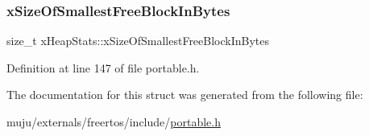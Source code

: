 \subsubsection{\texorpdfstring{x\+Size\+Of\+Smallest\+Free\+Block\+In\+Bytes}{xSizeOfSmallestFreeBlockInBytes}}
{\footnotesize\ttfamily size\+\_\+t x\+Heap\+Stats\+::x\+Size\+Of\+Smallest\+Free\+Block\+In\+Bytes}



Definition at line 147 of file portable.\+h.



The documentation for this struct was generated from the following file\+:\begin{DoxyCompactItemize}
\item 
muju/externals/freertos/include/\hyperlink{externals_2freertos_2include_2portable_8h}{portable.\+h}\end{DoxyCompactItemize}
